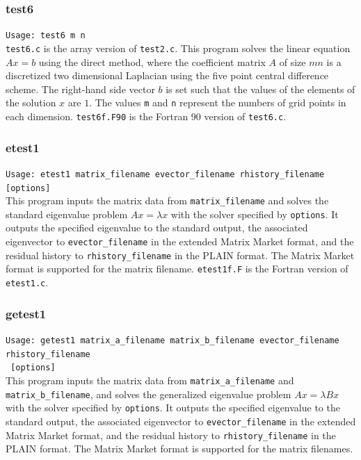\documentclass[a4paper]{article}
\begin{document}
\subsubsection{test6}

\verb+Usage: test6 m n+\\

{\tt test6.c} is the array version of {\tt test2.c}.
This program solves the linear equation $Ax = b$ using the direct method,
where the coefficient 
matrix $A$ of size $mn$ is a discretized two dimensional 
Laplacian using the five
point central difference scheme. 
The right-hand side vector $b$ is set such that the values of the elements
of the solution $x$ are $1$. 
The values {\tt m} and  {\tt n} represent the numbers of grid points
in each dimension. 
{\tt test6f.F90} is the Fortran 90 version of {\tt test6.c}.

\subsubsection{etest1}

\verb+Usage: etest1 matrix_filename evector_filename rhistory_filename [options]+\\

This program inputs the matrix data from {\tt matrix\_filename} and
solves the standard eigenvalue problem $Ax=\lambda x$ with 
the solver specified by {\tt options}. 
It outputs the specified eigenvalue to the standard output, 
the associated eigenvector to {\tt evector\_filename} 
in the extended Matrix Market format, and 
the residual history to {\tt rhistory\_filename} 
in the PLAIN format.
The Matrix Market format is supported for the matrix filename. 
{\tt etest1f.F} is the Fortran version of {\tt etest1.c}.

\subsubsection{getest1}

\verb+Usage: getest1 matrix_a_filename matrix_b_filename evector_filename rhistory_filename +\\
\verb+ [options]+\\

This program inputs the matrix data from {\tt matrix\_a\_filename}
and {\tt matrix\_b\_filename}, and
solves the generalized eigenvalue problem $Ax=\lambda Bx$ with 
the solver specified by {\tt options}. 
It outputs the specified eigenvalue to the standard output, 
the associated eigenvector to {\tt evector\_filename} 
in the extended Matrix Market format, and 
the residual history to {\tt rhistory\_filename} 
in the PLAIN format.
The Matrix Market format is supported for the matrix filenames. 
\end{document}
